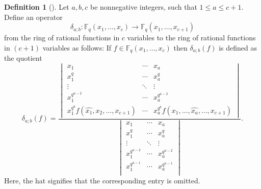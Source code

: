 \documentclass[12pt,a4paper]{report}
\theoremstyle{definition}
\newtheorem{definition}[theorem]{Definition}
\theoremstyle{remark}
\theoremstyle{definition}
\begin{document}
\begin{definition}[{\cite[Definition 1.2]{Ha_Hai_Nghia_2024}}]\label{def:delta_operator}
    Let $a, b, c$ be nonnegative integers, such that $1\leq a\leq c+1$. Define an operator
    \begin{equation*}
        \delta_{a;b}:\mathbb{F}_q(x_1, \ldots, x_c)\to \mathbb{F}_q(x_1, \ldots, x_{c+1})
    \end{equation*}
    from the ring of rational functions in $c$ variables to the ring of rational functions in $(c+1)$ variables as follows: If $f\in \mathbb{F}_q(x_1, \ldots, x_c)$ then $\delta_{a;b}(f)$ is defined as the quotient
    \begin{equation*}
        \delta_{a;b}(f)=\dfrac{\begin{vmatrix}
            x_1 & \cdots & x_a\\
            x_1^q & \cdots & x_a^q\\
            \vdots & \ddots & \vdots\\
            x_1^{q^{a-2}} & \cdots  & x_a^{q^{a-2}}\\
            x_1^{q^b}f(\widehat{x_1}, x_2, \ldots, x_{c+1}) & \cdots  & x_a^{q^b}f(x_1, \ldots, \widehat{x_a}, \ldots, x_{c+1})
        \end{vmatrix}}{\begin{vmatrix}
            x_1 & \cdots & x_a\\
            x_1^q & \cdots & x_a^q\\
            \vdots & \ddots & \vdots\\
            x_1^{q^{a-2}} & \cdots  & x_a^{q^{a-2}}\\
            x_1^{q^{a-1}} & \cdots  & x_a^{q^{a-1}}\\
        \end{vmatrix}}.
    \end{equation*}
    Here, the hat signifies that the corresponding entry is omitted.
\end{definition}
\end{document}
